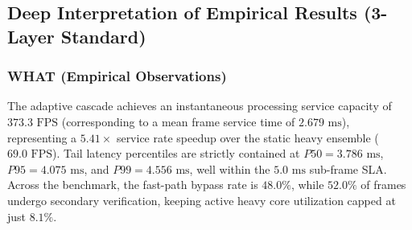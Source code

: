 \documentclass[conference]{IEEEtran}
\begin{document}
\begin{table}[t]
\centering
\caption{Empirical Routing Breakdown Across Visual Risk Regimes}
\label{tab:cascade_breakdown}
\end{table}

\subsection{Deep Interpretation of Empirical Results (3-Layer Standard)}
\subsubsection{WHAT (Empirical Observations)}
The adaptive cascade achieves an instantaneous processing service capacity of $373.3\text{ FPS}$ (corresponding to a mean frame service time of $2.679\text{ ms}$), representing a $5.41\times$ service rate speedup over the static heavy ensemble ($69.0\text{ FPS}$). Tail latency percentiles are strictly contained at $P50 = 3.786\text{ ms}$, $P95 = 4.075\text{ ms}$, and $P99 = 4.556\text{ ms}$, well within the $5.0\text{ ms}$ sub-frame SLA. Across the benchmark, the fast-path bypass rate is $48.0\%$, while $52.0\%$ of frames undergo secondary verification, keeping active heavy core utilization capped at just $8.1\%$.
\end{document}

